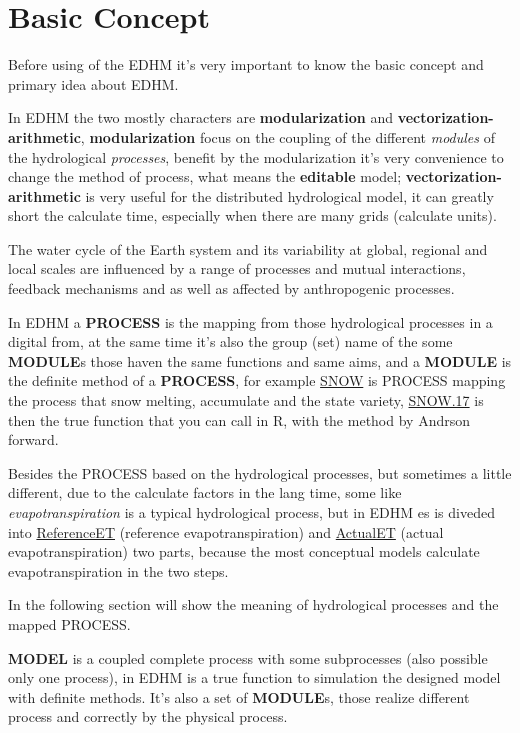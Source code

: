 \documentclass[
]{book}
\begin{document}
\hypertarget{base}{%
\chapter{Basic Concept}\label{base}}

Before using of the EDHM it's very important to know the basic concept and primary idea about EDHM.

In EDHM the two mostly characters are \textbf{modularization} and \textbf{vectorization-arithmetic}, \textbf{modularization} focus on the coupling of the different \emph{modules} of the hydrological \emph{processes}, benefit by the modularization it's very convenience to change the method of process, what means the \textbf{editable} model; \textbf{vectorization-arithmetic} is very useful for the distributed hydrological model, it can greatly short the calculate time, especially when there are many grids (calculate units).

The water cycle of the Earth system and its variability at global, regional and local scales are influenced by a range of processes and mutual interactions, feedback mechanisms and as well as affected by anthropogenic processes.\citep{Rast.2014}

In EDHM a \textbf{PROCESS} is the mapping from those hydrological processes in a digital from, at the same time it's also the group (set) name of the some \textbf{MODULE}s those haven the same functions and same aims, and
a \textbf{MODULE} is the definite method of a \textbf{PROCESS}, for example \protect\hyperlink{SNOW}{SNOW} is PROCESS mapping the process that snow melting, accumulate and the state variety, \protect\hyperlink{SNOW.17}{SNOW.17} is then the true function that you can call in R, with the method by Andrson\citep{Anderson.1973} forward.

Besides the PROCESS based on the hydrological processes, but sometimes a little different, due to the calculate factors in the lang time, some like \emph{evapotranspiration} is a typical hydrological process, but in EDHM es is diveded into \protect\hyperlink{ReferenceET}{ReferenceET} (reference evapotranspiration) and \protect\hyperlink{ActualET}{ActualET} (actual evapotranspiration) two parts, because the most conceptual models calculate evapotranspiration in the two steps.

In the following section will show the meaning of hydrological processes and the mapped PROCESS.

\textbf{MODEL} is a coupled complete process with some subprocesses (also possible only one process), in EDHM is a true function to simulation the designed model with definite methods. It's also a set of \textbf{MODULE}s, those realize different process and correctly by the physical process.
\end{document}
